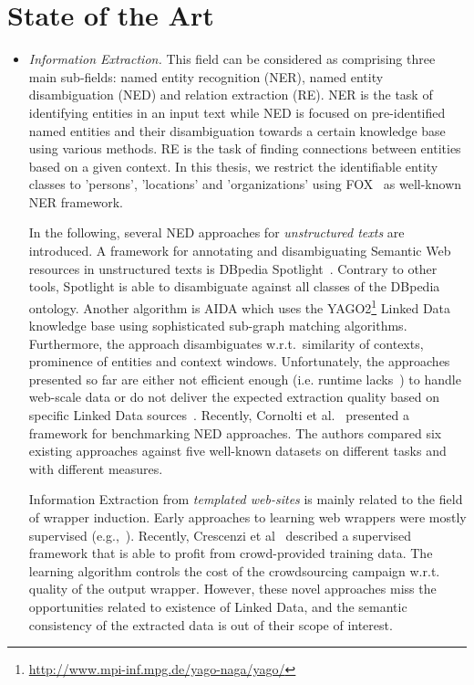 \section{State of the Art}\label{relatedWork}
\begin{itemize}
\item[(1)]\emph{Information Extraction.} This field can be considered as comprising three main sub-fields: named entity recognition (NER), named entity disambiguation (NED) and relation extraction (RE).
NER is the task of identifying entities in an input text while NED is focused on pre-identified  named entities and their disambiguation towards a certain knowledge base using various methods.
RE is the task of finding connections between entities based on a given context.
In this thesis, we restrict the identifiable entity classes to 'persons', 'locations' and 'organizations' using FOX~\cite{FOX} as well-known NER framework.

In the following, several NED approaches for \emph{unstructured texts} are introduced.
A framework for annotating and disambiguating Semantic Web resources in unstructured texts is DBpedia Spotlight~\cite{spotlight}.
Contrary to other tools, Spotlight is able to disambiguate against all classes of the DBpedia ontology.
Another algorithm is AIDA which uses the YAGO2\footnote{\url{http://www.mpi-inf.mpg.de/yago-naga/yago/}} Linked Data knowledge base using sophisticated sub-graph matching algorithms. 
Furthermore, the approach disambiguates w.r.t.~similarity of contexts, prominence of entities and context windows.
Unfortunately, the approaches presented so far are either not efficient enough (i.e. runtime lacks~\cite{cornolti}) to handle web-scale data or do not deliver the expected extraction quality based on specific Linked Data sources~\cite{AGDISTIS}.
Recently, Cornolti et al.~\cite{cornolti} presented a framework for benchmarking NED approaches.
The authors compared six existing approaches against five well-known datasets on different tasks and with different measures. 

Information Extraction from \emph{templated web-sites} is mainly related to the field of wrapper induction. 
Early approaches to learning web wrappers were mostly supervised (e.g.,~\cite{Hogue:2005:TAU:1060745.1060762,flesca2004web}). 
Recently, Crescenzi et al~\cite{Crescenzi2013} described a supervised framework that is able to profit from crowd-provided training data. 
The learning algorithm controls the cost of the crowdsourcing campaign w.r.t. quality of the output wrapper.
However, these novel approaches miss the opportunities related to existence of Linked Data, and the semantic consistency of the extracted data is out of their scope of interest.


\end{itemize}
